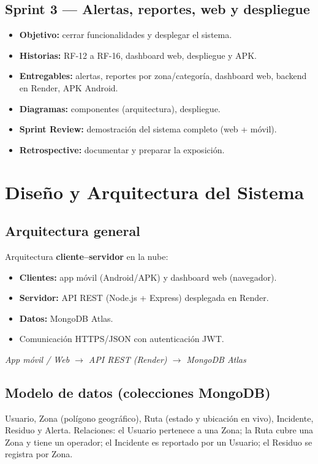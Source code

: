\documentclass[11pt,a4paper]{article}
\begin{document}
\subsection{Sprint 3 — Alertas, reportes, web y despliegue}
\begin{itemize}[leftmargin=*]
    \item \textbf{Objetivo:} cerrar funcionalidades y desplegar el sistema.
    \item \textbf{Historias:} RF-12 a RF-16, dashboard web, despliegue y APK.
    \item \textbf{Entregables:} alertas, reportes por zona/categoría, dashboard web, backend en Render, APK Android.
    \item \textbf{Diagramas:} componentes (arquitectura), despliegue.
    \item \textbf{Sprint Review:} demostración del sistema completo (web + móvil).
    \item \textbf{Retrospective:} documentar y preparar la exposición.
\end{itemize}

\newpage
\section{Diseño y Arquitectura del Sistema}
\subsection{Arquitectura general}
Arquitectura \textbf{cliente--servidor} en la nube:
\begin{itemize}[leftmargin=*]
    \item \textbf{Clientes:} app móvil (Android/APK) y dashboard web (navegador).
    \item \textbf{Servidor:} API REST (Node.js + Express) desplegada en Render.
    \item \textbf{Datos:} MongoDB Atlas.
    \item Comunicación HTTPS/JSON con autenticación JWT.
\end{itemize}
\begin{center}
\textit{App móvil / Web $\longrightarrow$ API REST (Render) $\longrightarrow$ MongoDB Atlas}
\end{center}

\subsection{Modelo de datos (colecciones MongoDB)}
Usuario, Zona (polígono geográfico), Ruta (estado y ubicación en vivo), Incidente, Residuo y Alerta. Relaciones: el Usuario pertenece a una Zona; la Ruta cubre una Zona y tiene un operador; el Incidente es reportado por un Usuario; el Residuo se registra por Zona.
\end{document}
